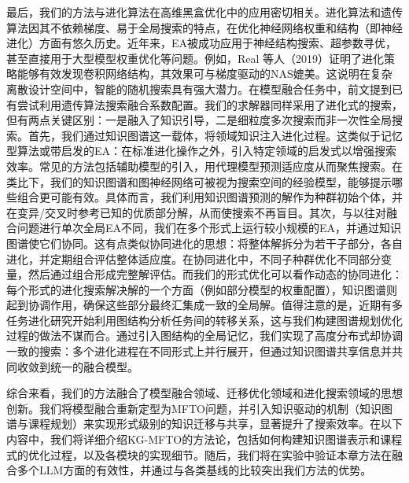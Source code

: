 \documentclass[../main.tex]{subfiles}
\begin{document}
\label{sec:ch5-2-4-knowledge-guided-evolutionary-search}
最后，我们的方法与进化算法在高维黑盒优化中的应用密切相关。进化算法和遗传算法因其不依赖梯度、易于全局搜索的特点，在优化神经网络权重和结构（即神经进化）方面有悠久历史。近年来，EA被成功应用于神经结构搜索、超参数寻优，甚至直接用于大型模型权重优化等问题。例如，Real 等人（2019）证明了进化策略能够有效发现卷积网络结构，其效果可与梯度驱动的NAS媲美。这说明在复杂离散设计空间中，智能的随机搜索具有强大潜力。在模型融合任务中，前文提到已有尝试利用遗传算法搜索融合系数配置。我们的求解器同样采用了进化式的搜索，但有两点关键区别：一是融入了知识引导，二是细粒度多次搜索而非一次性全局搜索。首先，我们通过知识图谱这一载体，将领域知识注入进化过程。这类似于记忆型算法或带启发的EA：在标准进化操作之外，引入特定领域的启发式以增强搜索效率。常见的方法包括辅助模型的引入，用代理模型预测适应度从而聚焦搜索。在类比下，我们的知识图谱和图神经网络可被视为搜索空间的经验模型，能够提示哪些组合更可能有效。具体而言，我们利用知识图谱预测的解作为种群初始个体，并在变异/交叉时参考已知的优质部分解，从而使搜索不再盲目。其次，与以往对融合问题进行单次全局EA不同，我们在多个形式上运行较小规模的EA，并通过知识图谱使它们协同。这有点类似协同进化的思想：将整体解拆分为若干子部分，各自进化，并定期组合评估整体适应度。在协同进化中，不同子种群优化不同部分变量，然后通过组合形成完整解评估。而我们的形式优化可以看作动态的协同进化：每个形式的进化搜索解决解的一个方面（例如部分模型的权重配置），知识图谱则起到协调作用，确保这些部分最终汇集成一致的全局解。值得注意的是，近期有多任务进化研究开始利用图结构分析任务间的转移关系，这与我们构建图谱规划优化过程的做法不谋而合。通过引入图结构的全局记忆，我们实现了高度分布式却协调一致的搜索：多个进化进程在不同形式上并行展开，但通过知识图谱共享信息并共同收敛到统一的融合模型。

综合来看，我们的方法融合了模型融合领域、迁移优化领域和进化搜索领域的思想创新。我们将模型融合重新定型为MFTO问题，并引入知识驱动的机制（知识图谱与课程规划）来实现形式级别的知识迁移与共享，显著提升了搜索效率。在以下内容中，我们将详细介绍KG-MFTO的方法论，包括如何构建知识图谱表示和课程式的优化过程，以及各模块的实现细节。随后，我们将在实验中验证本章方法在融合多个LLM方面的有效性，并通过与各类基线的比较突出我们方法的优势。

\label{sec:ch5-3-problem-definition-and-form-decomposition}
\end{document}
